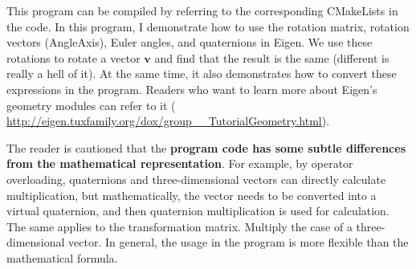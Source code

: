 This program can be compiled by referring to the corresponding CMakeLists in the code. In this program, I demonstrate how to use the rotation matrix, rotation vectors (AngleAxis), Euler angles, and quaternions in Eigen. We use these rotations to rotate a vector $ \bm {v} $ and find that the result is the same (different is really a hell of it). At the same time, it also demonstrates how to convert these expressions in the program. Readers who want to learn more about Eigen's geometry modules can refer to it ( \url {http://eigen.tuxfamily.org/dox/group__TutorialGeometry.html}).

The reader is cautioned that the \textbf {program code has some subtle differences from the mathematical representation}. For example, by operator overloading, quaternions and three-dimensional vectors can directly calculate multiplication, but mathematically, the vector needs to be converted into a virtual quaternion, and then quaternion multiplication is used for calculation. The same applies to the transformation matrix. Multiply the case of a three-dimensional vector. In general, the usage in the program is more flexible than the mathematical formula.